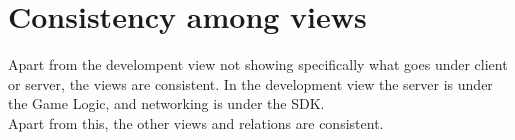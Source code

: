 \section{Consistency among views} 
\label{sec:consistencyamongviews}

Apart from the develompent view not showing specifically what goes under client
or server, the views are consistent. In the development view the server is
under the Game Logic, and networking is under the SDK.\\
Apart from this, the other views and relations are consistent.
